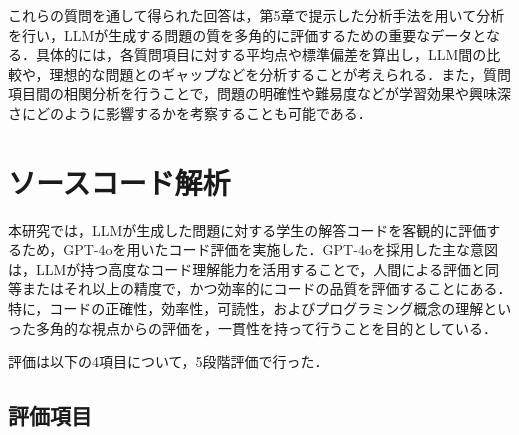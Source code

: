 \documentclass[11pt]{jreport}
\begin{document}
これらの質問を通して得られた回答は，第5章で提示した分析手法を用いて分析を行い，LLMが生成する問題の質を多角的に評価するための重要なデータとなる．具体的には，各質問項目に対する平均点や標準偏差を算出し，LLM間の比較や，理想的な問題とのギャップなどを分析することが考えられる．また，質問項目間の相関分析を行うことで，問題の明確性や難易度などが学習効果や興味深さにどのように影響するかを考察することも可能である．

\section{ソースコード解析}
本研究では，LLMが生成した問題に対する学生の解答コードを客観的に評価するため，GPT-4oを用いたコード評価を実施した．GPT-4oを採用した主な意図は，LLMが持つ高度なコード理解能力を活用することで，人間による評価と同等またはそれ以上の精度で，かつ効率的にコードの品質を評価することにある．特に，コードの正確性，効率性，可読性，およびプログラミング概念の理解といった多角的な視点からの評価を，一貫性を持って行うことを目的としている．

評価は以下の4項目について，5段階評価で行った．

\subsection{評価項目}
\end{document}
